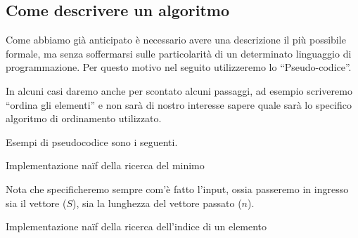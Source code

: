 \subsection{Come descrivere un algoritmo}

Come abbiamo già anticipato è necessario avere una descrizione il più possibile formale, ma senza soffermarsi sulle particolarità di un determinato linguaggio di programmazione.
Per questo motivo nel seguito utilizzeremo lo \enquote{Pseudo-codice}.

In alcuni casi daremo anche per scontato alcuni passaggi, ad esempio scriveremo \enquote{ordina gli elementi} e non sarà di nostro interesse sapere quale sarà lo specifico algoritmo di ordinamento utilizzato.

Esempi di pseudocodice sono i seguenti.

\begin{algorithm}[H]
\caption{Implementazione na\"if della ricerca del minimo}

\BlankLine
{}
\end{algorithm}

Nota che specificheremo sempre com'è fatto l'input, ossia passeremo in ingresso sia il vettore (\(S\)), sia la lunghezza del vettore passato (\(n\)).

\begin{algorithm}[H]
\caption{Implementazione na\"if della ricerca dell'indice di un elemento}

\BlankLine
{}
\end{algorithm}

